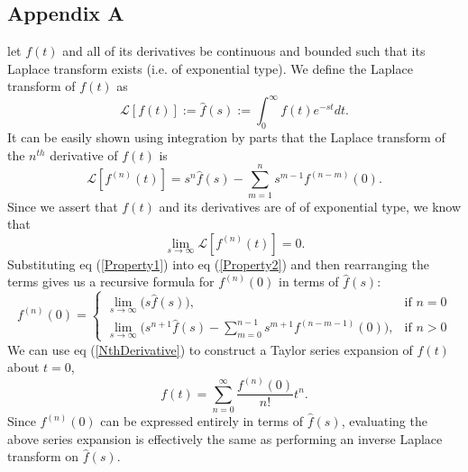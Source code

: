 \documentclass[12pt]{article}
\begin{document}
\subsection{Appendix A}
let $f(t)$ and all of its derivatives be continuous and bounded such
that its Laplace transform exists (i.e. of exponential type).  We
define the Laplace transform of $f(t)$ as
\begin{equation}
  \mathcal{L}[f(t)] := \hat{f}(s) := \int_{0}^\infty f(t)e^{-st}dt.
\end{equation}
It can be easily shown using integration by parts that the Laplace
transform of the $n^{th}$ derivative of $f(t)$ is
\begin{equation}\label{Property1}
  \mathcal{L}[f^{(n)}(t)] = s^n\hat{f}(s) - \sum_{m=1}^ns^{m-1}f^{(n-m)}(0).
\end{equation}
Since we assert that $f(t)$ and its derivatives are of of exponential
type, we know that
\begin{equation}\label{Property2}
  \lim_{s \to \infty}\mathcal{L}[f^{(n)}(t)] = 0.
\end{equation}
Substituting eq (\ref{Property1}) into eq (\ref{Property2}) and then
rearranging the terms gives us a recursive formula for
$f^{(n)}(0)$ in terms of $\hat{f}(s)$:
\begin{equation}\label{NthDerivative}
  f^{(n)}(0) = 
  \begin{cases}
    \lim_{s \to \infty} \big( s\hat{f}(s)\big)\nonumber, &\text{if }n = 0\\
    \lim_{s \to \infty} \big( s^{n + 1}\hat{f}(s) - \sum_{m=0}^{n-1}
    s^{m+1}f^{(n-m-1)}(0)\big), &\text{if }n > 0
  \end{cases}
\end{equation}
We can use eq (\ref{NthDerivative}) to construct a Taylor series
expansion of $f(t)$ about $t=0$,
\begin{equation}
  f(t) = \sum_{n=0}^\infty\frac{f^{(n)}(0)}{n!}t^n.
\end{equation}
Since $f^{(n)}(0)$ can be expressed entirely in terms of
$\hat f(s)$, evaluating the above series expansion is effectively the
same as performing an inverse Laplace transform on $\hat f(s)$.
\end{document}
